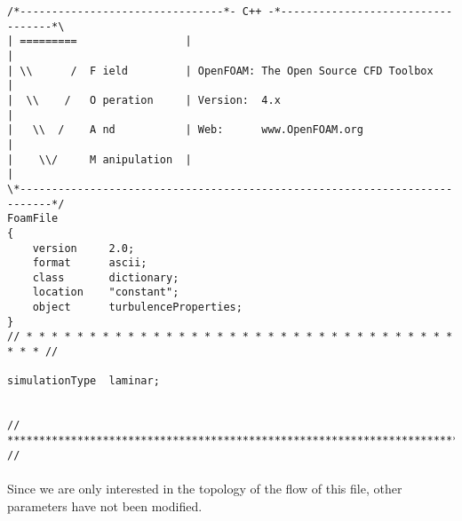 \pagebreak

\begin{footnotesize}
\begin{verbatim}
/*--------------------------------*- C++ -*----------------------------------*\
| =========                 |                                                 |
| \\      /  F ield         | OpenFOAM: The Open Source CFD Toolbox           |
|  \\    /   O peration     | Version:  4.x                                   |
|   \\  /    A nd           | Web:      www.OpenFOAM.org                      |
|    \\/     M anipulation  |                                                 |
\*---------------------------------------------------------------------------*/
FoamFile
{
    version     2.0;
    format      ascii;
    class       dictionary;
    location    "constant";
    object      turbulenceProperties;
}
// * * * * * * * * * * * * * * * * * * * * * * * * * * * * * * * * * * * * * //

simulationType  laminar;


// ************************************************************************* //
\end{verbatim}
\end{footnotesize}

\paragraph{}Since we are only interested in the topology of the flow of this file, other parameters have not been modified.